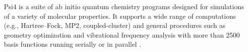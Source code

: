 
Psi4 is a suite of ab initio quantum chemistry programs designed for simulations of a variety of molecular properties. It supports a wide range of computations (e.g., Hartree–Fock, MP2, coupled-cluster) and general procedures such as geometry optimization and vibrational frequency analysis with more than 2500 basis functions running serially or in parallel \cite{Turney_2011}.
